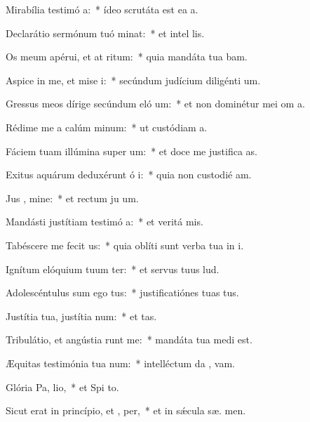 \item Mirabília testimó a:~* ídeo scrutáta est ea  a.
\item Declarátio sermónum tuó minat:~* et intel  lis.
\item Os meum apérui, et at ritum:~* quia mandáta tua bam.
\item Aspice in me, et mise i:~* secúndum judícium diligénti  um.
\item Gressus meos dírige secúndum eló um:~* et non dominétur mei om a.
\item Rédime me a calúm minum:~* ut custódiam  a.
\item Fáciem tuam illúmina super  um:~* et doce me justifica as.
\item Exitus aquárum deduxérunt ó i:~* quia non custodié  am.
\item Jus , mine:~* et rectum ju um.
\item Mandásti justítiam testimó a:~* et veritá  mis.
\item Tabéscere me fecit  us:~* quia oblíti sunt verba tua in i.
\item Ignítum elóquium tuum ter:~* et servus tuus  lud.
\item Adolescéntulus sum ego  tus:~* justificatiónes tuas   tus.
\item Justítia tua, justítia  num:~* et   tas.
\item Tribulátio, et angústia runt me:~* mandáta tua medi  est.
\item Æquitas testimónia tua  num:~* intelléctum da ,  vam.
\item Glória Pa,  lio,~* et Spi to.
\item Sicut erat in princípio, et ,  per,~* et in sǽcula sæ. men.

